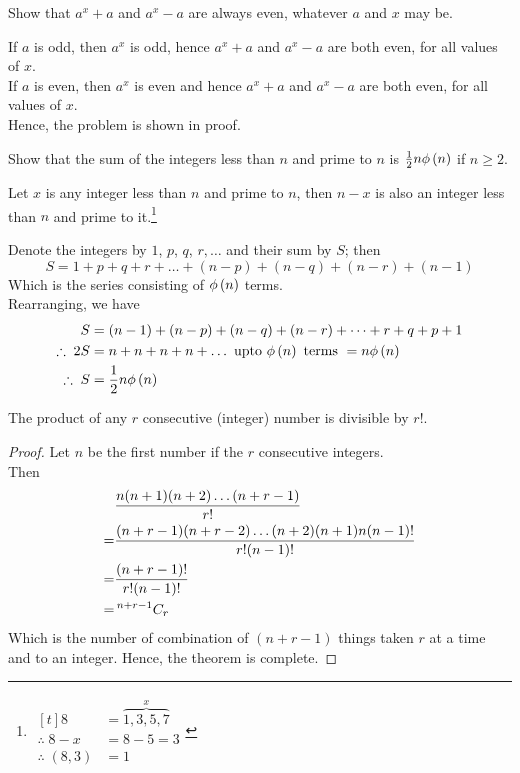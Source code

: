 \documentclass[12pt,class=book,crop=false]{standalone}
\begin{document}
\begin{qn}[C.H.88 E]
    Show that $ a^x+a $ and $ a^x-a $ are always even, whatever $ a $ and $ x $ may be.
\end{qn}
\begin{soln}
    If $ a $ is odd, then $ a^x $ is odd, hence $ a^x+a $ and $ a^x-a $ are both even, for all values of $ x $.\\
    If $ a $ is even, then $ a^x $ is even and hence $ a^x+a $ and $ a^x-a $ are both even, for all values of $ x $.\\

    Hence, the problem is shown in proof.
\end{soln}
\begin{qn}[I]
    Show that the sum of the integers less than $ n $ and prime to $ n $ is $ \frac{1}{2}n\phi\left( n \right) $ if $ n\geq2 $.
\end{qn}
\begin{soln}
    Let $ x $ is any integer less than $ n $ and prime to $ n $, then $ n-x $ is also an integer less than $ n $ and prime to it.\footnote{$ \begin{aligned}[t]
        8&= \overbrace{1, 3, 5, 7}^{x}\\
        \therefore\; 8-x&=8-5=3\\
        \therefore\; (8,3)&=1
    \end{aligned} $}

    Denote the integers by $ 1 $, $ p $, $ q $, $ r, \dots $ and their sum by $ S $; then
    \[
        S=1+p+q+r+\dots+(n-p)+(n-q)+(n-r)+(n-1)
    \]
    Which is the series consisting of $ \phi\left( n \right) $ terms.\\
    Rearranging, we have
    \begin{align*}
        S&=(n-1)+(n-p)+(n-q)+(n-r)+\dots+r+q+p+1\\
        \therefore\;2S&=n+n+n+n+\dots\text{ upto }\phi\left( n \right) \text{ terms }=n\phi\left( n \right)\\
        \therefore\;S&=\frac{1}{2}n\phi\left( n \right)
    \end{align*}
\end{soln}
\begin{thm}[E]
    The product of any $ r $ consecutive (integer) number is divisible by $ r! $.
\end{thm}
\begin{proof}
    Let $ n $ be the first number if the $ r $ consecutive integers.\\
    Then
    \begin{align*}
        &\frac{n(n+1)(n+2)\dots(n+r-1)}{r!}\\
        =&\frac{(n+r-1)(n+r-2)\dots(n+2)(n+1)n(n-1)!}{r!(n-1)!}\\
        =&\frac{(n+r-1)!}{r!(n-1)!}\\
        =&\,{}^{n+r-1}C_{r}
    \end{align*}
    Which is the number of combination of $ (n+r-1) $ things taken $ r $ at a time and to an integer. Hence, the theorem is complete.
\end{proof}
\end{document}
